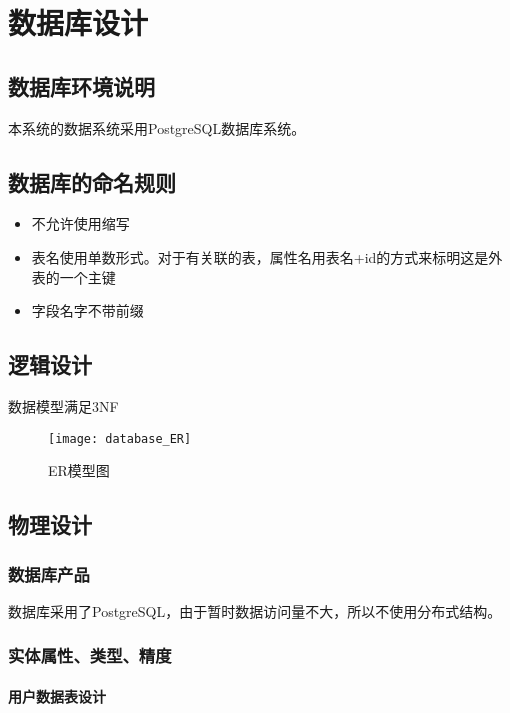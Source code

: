 \chapter{数据库设计}
\section{数据库环境说明}
本系统的数据系统采用PostgreSQL数据库系统。


\section{数据库的命名规则}
\begin{itemize}
	\item 不允许使用缩写
	\item 表名使用单数形式。对于有关联的表，属性名用表名+id的方式来标明这是外表的一个主键
	\item 字段名字不带前缀
\end{itemize}

\section{逻辑设计}

数据模型满足3NF\\
\newpage

\begin{figure}[ht]
	\centering
	\texttt{[image: database\_ER]}
	\caption{ER模型图}\label{fig:ER}
\end{figure}

\section{物理设计}

\subsection{数据库产品}

数据库采用了PostgreSQL，由于暂时数据访问量不大，所以不使用分布式结构。

\subsection{实体属性、类型、精度}

\subsubsection{用户数据表设计}

